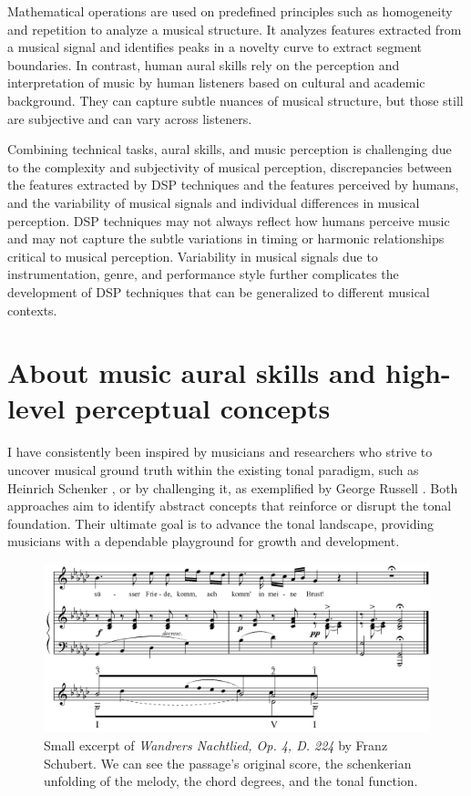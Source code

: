 

Mathematical operations are used on predefined principles such as homogeneity and repetition to analyze a musical structure. It analyzes features extracted from a musical signal and identifies peaks in a novelty curve to extract segment boundaries. In contrast, human aural skills rely on the perception and interpretation of music by human listeners based on cultural and academic background. They can capture subtle nuances of musical structure, but those still are subjective and can vary across listeners.

Combining technical tasks, aural skills, and music perception is challenging due to the complexity and subjectivity of musical perception, discrepancies between the features extracted by DSP techniques and the features perceived by humans, and the variability of musical signals and individual differences in musical perception. DSP techniques may not always reflect how humans perceive music and may not capture the subtle variations in timing or harmonic relationships critical to musical perception. Variability in musical signals due to instrumentation, genre, and performance style further complicates the development of DSP techniques that can be generalized to different musical contexts.

\section{About music aural skills and high-level perceptual concepts}

I have consistently been inspired by musicians and researchers who strive to uncover musical ground truth within the existing tonal paradigm, such as Heinrich Schenker \cite{}, or by challenging it, as exemplified by George Russell \cite{LydianRussell}. Both approaches aim to identify abstract concepts that reinforce or disrupt the tonal foundation. Their ultimate goal is to advance the tonal landscape, providing musicians with a dependable playground for growth and development.


\begin{figure}[ht]
\includegraphics[clip,width=\columnwidth]{figures/schenkerian analysis/SchubertOp4no3.png}%
\caption{Small excerpt of \textit{Wandrers Nachtlied, Op. 4, D. 224} by Franz Schubert. We can see the passage's original score, the schenkerian unfolding of the melody, the chord degrees, and the tonal function.}
\label{fig:Wandrers Nachtlied, Op. 4, D. 224}
\end{figure}

